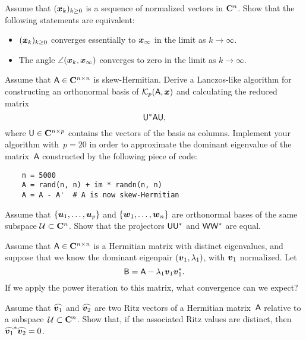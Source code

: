 \begin{exercise}
    Assume that $(\mathbf{\boldsymbol{x}}_k)_{k \geq 0}$ is a sequence of normalized vectors in $\mathbf C^n$.
    Show that the following statements are equivalent:
    \begin{itemize}
        \item $(\mathbf{\boldsymbol{x}}_k)_{k \geq 0}$ converges essentially to $\mathbf{\boldsymbol{x}}_{\infty}$ in the limit as $k \to \infty$.
        \item The angle $\angle(\mathbf{\boldsymbol{x}}_k, \mathbf{\boldsymbol{x}}_{\infty})$ converges to zero in the limit as $k \to \infty$.
    \end{itemize}
\end{exercise}

\begin{exercise}
    Assume that $\mathsf A \in \mathbf C^{n \times n}$ is skew-Hermitian.
    Derive a Lanczos-like algorithm for constructing an orthonormal basis of $\mathcal K_p(\mathsf A, \mathbf{\boldsymbol{x}})$
    and calculating the reduced matrix
    \[
        \mathsf U^* \mathsf A \mathsf U,
    \]
    where $\mathsf U \in \mathbf C^{n \times p}$ contains the vectors of the basis as columns.
    Implement your algorithm with~$p = 20$ in order to approximate the dominant eigenvalue of the matrix~$\mathsf A$ constructed by the following piece of code:
    \begin{verbatim}
    n = 5000
    A = rand(n, n) + im * randn(n, n)
    A = A - A'  # A is now skew-Hermitian
    \end{verbatim}
\end{exercise}

\begin{exercise}
    Assume that $\{\mathbf{\boldsymbol{u}}_1, \dotsc, \mathbf{\boldsymbol{u}}_p \}$ and $\{\mathbf{\boldsymbol{w}}_1, \dotsc, \mathbf{\boldsymbol{w}}_n\}$
    are orthonormal bases of the same subspace $\mathcal U \subset \mathbf C^n$.
    Show that the projectors $\mathsf U \mathsf U^*$ and $\mathsf W \mathsf W^*$ are equal.
\end{exercise}

\begin{exercise}
    Assume that $\mathsf A \in \mathbf C^{n \times n}$ is a Hermitian matrix with distinct eigenvalues,
    and suppose that we know the dominant eigenpair $(\mathbf{\boldsymbol{v}}_1, \lambda_1)$,
    with $\mathbf{\boldsymbol{v}}_1$ normalized.
    Let
    \[
        \mathsf B = \mathsf A - \lambda_1 \mathbf{\boldsymbol{v}}_1 \mathbf{\boldsymbol{v}}_1^*.
    \]
    If we apply the power iteration to this matrix,
    what convergence can we expect?
\end{exercise}

\begin{exercise}
    Assume that $\widehat{\mathbf{\boldsymbol{v}}_1}$ and $\widehat{\mathbf{\boldsymbol{v}}_2}$ are two Ritz vectors of a Hermitian matrix~$\mathsf A$ relative to a subspace~$\mathcal U \subset \mathbf C^n$.
    Show that, if the associated Ritz values are distinct,
    then $\widehat{\mathbf{\boldsymbol{v}}_1}^* \widehat{\mathbf{\boldsymbol{v}}_2} = 0$.
\end{exercise}

